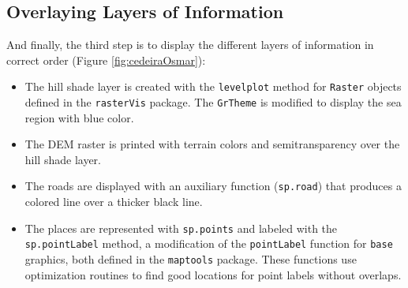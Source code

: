 \subsection{Overlaying Layers of Information}
\label{sec-1-3}
And finally, the third step is to display the different layers of
information in correct order (Figure \ref{fig:cedeiraOsmar}):

\begin{itemize}
\item The hill shade layer is created with the \texttt{levelplot} method for
  \texttt{Raster} objects defined in the \texttt{rasterVis} package. The
  \texttt{GrTheme} is modified to display the sea region with blue color.

\item The DEM raster is printed with terrain colors and
semitransparency over the hill shade layer.

\item The roads are displayed with an auxiliary function (\texttt{sp.road})
that produces a colored line over a thicker black line.

\item The places are represented with \texttt{sp.points} and labeled with
the \texttt{sp.pointLabel} method, a modification of the \texttt{pointLabel}
function for \texttt{base} graphics, both defined in the \texttt{maptools}
package. These functions use optimization routines to find good
locations for point labels without overlaps.
\end{itemize}


